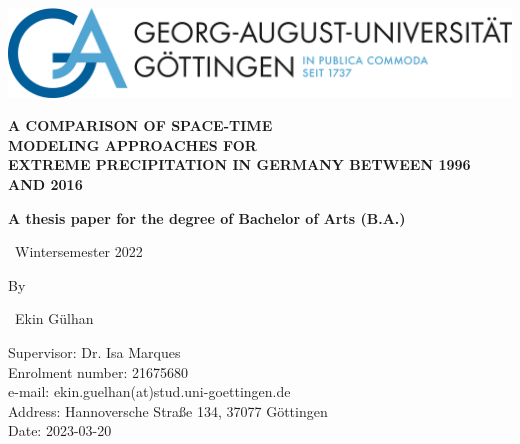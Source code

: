 \documentclass[
  12pt,
]{article}
\author{}
\date{\vspace{-2.5em}}
\begin{document}
\allsectionsfont{\centering}
\subsectionfont{\centering}
\subsubsectionfont{\centering}


\begin{FlushRight}

\vspace{0cm}


\includegraphics[width=0.5\linewidth]{../Input/Images/LogoUni} 

\end{FlushRight}

\begin{centering}

\vspace{3 cm}

\LARGE

{\bf A COMPARISON OF SPACE-TIME\\MODELING APPROACHES FOR\\EXTREME PRECIPITATION IN GERMANY BETWEEN 1996 AND 2016} 

\vspace{0.5 cm}

\large
{\bf A thesis paper for the degree of Bachelor of Arts (B.A.)}
 
\vspace{1.5cm}
 
{\ Wintersemester 2022}

\normalsize
\singlespacing

By

\Large
\singlespacing
{\ Ekin Gülhan}

\end{centering}

\begin{FlushLeft}

\vspace{3 cm}

\Large
\singlespacing
\normalsize
Supervisor: Dr. Isa Marques \\Enrolment number: 21675680 \\e-mail: ekin.guelhan(at)stud.uni-goettingen.de \\Address: Hannoversche Straße 134, 37077 Göttingen \\Date: 2023-03-20 

\end{FlushLeft}
\end{document}
